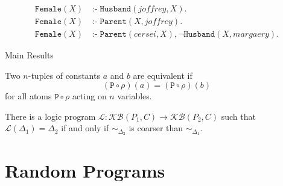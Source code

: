 \documentclass{beamer}
\DeclareMathOperator{\ifff}{:-}
\begin{document}
\begin{frame}
\begin{block}{}
    \begin{align*}
      \mathtt{Female}(X) &\ifff \mathtt{Husband}(\mathit{joffrey}, X). \\
      \mathtt{Female}(X) &\ifff \mathtt{Parent}(X, \mathit{joffrey}). \\
      \mathtt{Female}(X) &\ifff \mathtt{Parent}(\mathit{cersei}, X), \neg\mathtt{Husband}(X, \mathit{margaery}).
    \end{align*}
    \vspace*{-1.5\baselineskip}\setlength\belowdisplayshortskip{0pt}
  \end{block}
\end{frame}

\begin{frame}{Main Results}
  \begin{definition}[Equivalence]
    Two $n$-tuples of constants $a$ and $b$ are \alert{equivalent} if
    \[
      (\mathtt{P} \circ \rho)(a) = (\mathtt{P} \circ \rho)(b)
    \]
    for all atoms $\mathtt{P} \circ \rho$ acting on $n$ variables.
  \end{definition}
  \pause
  \begin{theorem}
    There is a logic program $\mathcal{L}\colon \mathcal{KB}(P_1, C) \to
    \mathcal{KB}(P_2, C)$ such that $\mathcal{L}(\Delta_1) = \Delta_2$ if and
    only if ${\sim_{\Delta_2}}$ is coarser than ${\sim_{\Delta_1}}$.
  \end{theorem}
\end{frame}

\section{Random Programs}
\end{document}

